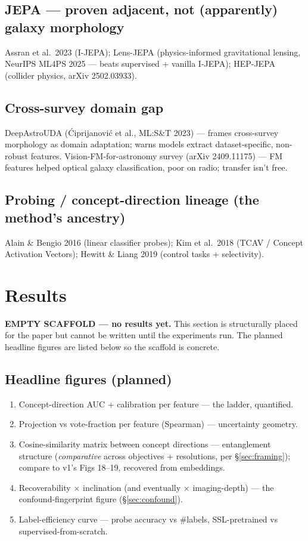 \documentclass[11pt,a4paper]{article}
\begin{document}
\subsection{JEPA --- proven adjacent, not (apparently) galaxy morphology}
Assran et al.\ 2023 (I-JEPA); Lens-JEPA (physics-informed gravitational lensing, NeurIPS ML4PS
2025 --- beats supervised + vanilla I-JEPA); HEP-JEPA (collider physics, arXiv 2502.03933).

\subsection{Cross-survey domain gap}
DeepAstroUDA (Ćiprijanović et al., ML:S\&T 2023) --- frames cross-survey morphology as domain
adaptation; warns models extract dataset-specific, non-robust features. Vision-FM-for-astronomy
survey (arXiv 2409.11175) --- FM features helped optical galaxy classification, poor on radio;
transfer isn't free.

\subsection{Probing / concept-direction lineage (the method's ancestry)}
Alain \& Bengio 2016 (linear classifier probes); Kim et al.\ 2018 (TCAV / Concept Activation
Vectors); Hewitt \& Liang 2019 (control tasks + selectivity).

\section{Results}\label{sec:results}

\begin{fillbox}
\textbf{EMPTY SCAFFOLD --- no results yet.} This section is structurally placed for the paper
but cannot be written until the experiments run. The planned headline figures are listed below
so the scaffold is concrete.
\end{fillbox}

\subsection{Headline figures (planned)}
\begin{enumerate}[leftmargin=1.5em,itemsep=2pt]
\item Concept-direction AUC $+$ calibration per feature --- the ladder, quantified.
\item Projection vs vote-fraction per feature (Spearman) --- uncertainty geometry.
\item Cosine-similarity matrix between concept directions --- entanglement structure (\emph{comparative} across objectives + resolutions, per \S\ref{sec:framing}); compare to v1's Figs 18--19, recovered from embeddings.
\item Recoverability $\times$ inclination (and eventually $\times$ imaging-depth) --- the confound-fingerprint figure (\S\ref{sec:confound}).
\item Label-efficiency curve --- probe accuracy vs \#labels, SSL-pretrained vs supervised-from-scratch.
\end{enumerate}
\end{document}
